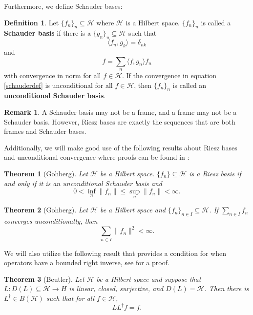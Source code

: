 \documentclass[11pt]{amsart}
\newtheorem*{thm*}{Theorem}
\theoremstyle{definition}
\newtheorem{def_n}[thm]{Definition}
\newtheorem{rem}[thm]{Remark}
\numberwithin{equation}{section}
\newcommand{\Hcal}{\mathcal{H}} %
\begin{document}
Furthermore, we define Schauder bases:
\begin{def_n}
Let $\{f_{n}\}_{n}\subseteq \Hcal$ where $\Hcal$ is a Hilbert space. $\{f_n\}_{n}$ is called a \textbf{Schauder basis} if there is a $\{g_{n}\}_{n}\subseteq \Hcal$ such that
$$\langle f_n,g_k\rangle=\delta_{nk}$$ and
\begin{equation}\label{schauderdef}
f=\sum_{n}\langle f,g_n\rangle f_n
\end{equation}
with convergence in norm for all $f\in \Hcal$.
If the convergence in equation \eqref{schauderdef} is unconditional for all $f\in \Hcal$, then $\{f_n\}_n$ is called an \textbf{unconditional Schauder basis}.
\end{def_n}
\begin{rem}
A Schauder basis may not be a frame, and a frame may not be a Schauder basis. However, Riesz bases are exactly the sequences that are both frames and Schauder bases.
\end{rem}

Additionally, we will make good use of the following results about Riesz bases and unconditional convergence where proofs can be found in \cite{Gohberg1969Theory}:
\begin{thm*}[Gohberg]
Let $\Hcal$ be a Hilbert space. $\{f_n\}\subseteq \Hcal$
is a Riesz basis if and only if it
is an unconditional Schauder basis and
$$0 < \inf_{n}
\|f_n\| \leq \sup_{n}
\|f_n\| < \infty.$$
\end{thm*}

\begin{thm*}[Gohberg]
Let $\Hcal$ be a Hilbert space and $\{f_n\}_{n\in I}\subseteq \Hcal$. If $\sum_{n\in I}f_n$ converges unconditionally, then
$$\sum_{n\in I}\|f_n\|^{2}<\infty.$$
\end{thm*}

We will also utilize the following result that provides a condition for when operators have a bounded right inverse, see \cite{Beutler1976Operator} for a proof.
\begin{thm*}[Beutler]
Let $\Hcal$ be a Hilbert space and suppose that $L: D(L)\subseteq \mathcal{H}\to H$ is linear, closed, surjective, and $\overline{D(L)}=\mathcal{H}$. Then there is $L^{\dagger}\in B(\mathcal{H})$ such that for all $f\in \Hcal$,
$$LL^{\dagger}f=f.$$
\end{thm*}
\end{document}
